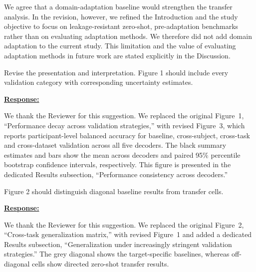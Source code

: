 \documentclass{article}
\begin{document}
We agree that a domain-adaptation baseline would strengthen the transfer
analysis. In the revision, however, we refined the Introduction and the study
objective to focus on leakage-resistant zero-shot, pre-adaptation benchmarks
rather than on evaluating adaptation methods. We therefore did not add domain
adaptation to the current study. This limitation and the value of evaluating
adaptation methods in future work are stated explicitly in the Discussion.

\vspace{0.3cm}


\begin{cmt}{}{}

Revise the presentation and interpretation. Figure 1 should include every
validation category with corresponding uncertainty estimates.

\end{cmt}
\vspace{0.1cm}
\noindent
\underline{\textbf{Response:}}
\vspace{0.2cm}

We thank the Reviewer for this suggestion. We replaced the original Figure~1,
``Performance decay across validation strategies,'' with revised Figure~3,
which reports participant-level balanced accuracy for baseline, cross-subject,
cross-task and cross-dataset validation across all five decoders. The black
summary estimates and bars show the mean across decoders and paired 95\%
percentile bootstrap confidence intervals, respectively. This figure is
presented in the dedicated Results subsection, ``Performance consistency across
decoders.''

\vspace{0.3cm}


\begin{cmt}{}{}

Figure 2 should distinguish diagonal baseline results from transfer cells.

\end{cmt}
\vspace{0.1cm}
\noindent
\underline{\textbf{Response:}}
\vspace{0.2cm}

We thank the Reviewer for this suggestion. We replaced the original Figure~2,
``Cross-task generalization matrix,'' with revised Figure~1 and added a
dedicated Results subsection, ``Generalization under increasingly stringent
validation strategies.'' The grey diagonal shows the target-specific baselines,
whereas off-diagonal cells show directed zero-shot transfer results.
\end{document}
